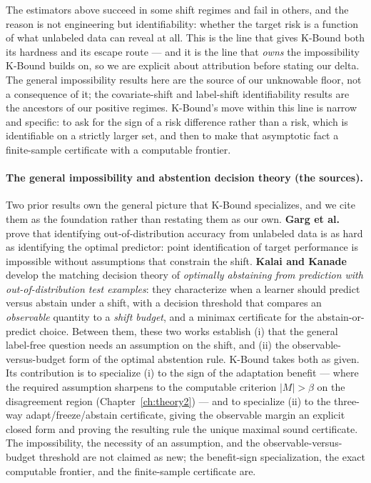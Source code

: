 The estimators above succeed in some shift regimes and fail in others, and the
reason is not engineering but identifiability: whether the target risk is a
function of what unlabeled data can reveal at all. This is the line that gives
K-Bound both its hardness and its escape route --- and it is the line that
\emph{owns} the impossibility K-Bound builds on, so we are explicit about
attribution before stating our delta. The general impossibility results here are
the source of our unknowable floor, not a consequence of it; the covariate-shift
and label-shift identifiability results are the ancestors of our positive regimes.
K-Bound's move within this line is narrow and specific: to ask for the sign of a
risk difference rather than a risk, which is identifiable on a strictly larger set,
and then to make that asymptotic fact a finite-sample certificate with a computable
frontier.

\paragraph{The general impossibility and abstention decision theory (the sources).}
Two prior results own the general picture that K-Bound specializes, and we cite
them as the foundation rather than restating them as our own. \textbf{Garg et
al.}~\cite{garg2022atc} prove that identifying out-of-distribution accuracy from
unlabeled data is as hard as identifying the optimal predictor: point
identification of target performance is impossible without assumptions that
constrain the shift. \textbf{Kalai and Kanade}~\cite{kalai2021abstain} develop the
matching decision theory of \emph{optimally abstaining from prediction with
out-of-distribution test examples}: they characterize when a learner should predict
versus abstain under a shift, with a decision threshold that compares an
\emph{observable} quantity to a \emph{shift budget}, and a minimax certificate for
the abstain-or-predict choice. Between them, these two works establish (i) that the
general label-free question needs an assumption on the shift, and (ii) the
observable-versus-budget form of the optimal abstention rule. K-Bound takes both as
given. Its contribution is to specialize (i) to the sign of the adaptation benefit
--- where the required assumption sharpens to the computable criterion $|M|>\beta$
on the disagreement region (Chapter~\ref{ch:theory2}) --- and to specialize (ii) to
the three-way adapt/freeze/abstain certificate, giving the observable margin an
explicit closed form and proving the resulting rule the unique maximal sound
certificate. The impossibility, the necessity of an assumption, and the
observable-versus-budget threshold are not claimed as new; the benefit-sign
specialization, the exact computable frontier, and the finite-sample certificate
are.


